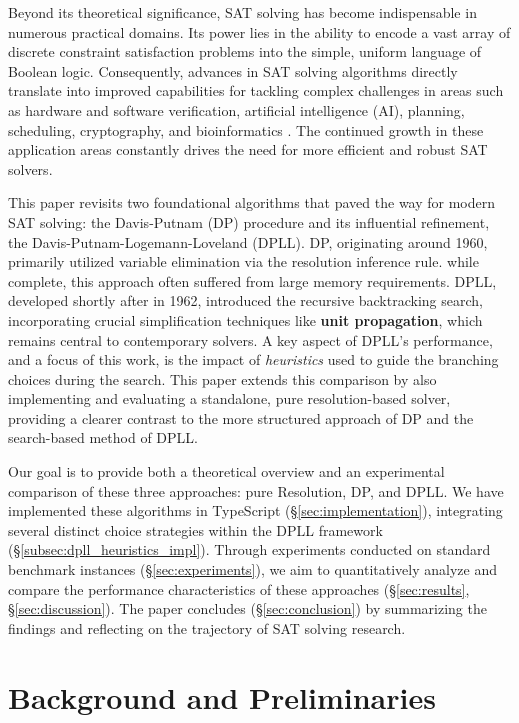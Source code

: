 \documentclass[12pt, a4paper]{article}
\begin{document}
Beyond its theoretical significance, SAT solving has become indispensable in numerous practical domains. Its power lies in the ability to encode a vast array of discrete constraint satisfaction problems into the simple, uniform language of Boolean logic. Consequently, advances in SAT solving algorithms directly translate into improved capabilities for tackling complex challenges in areas such as hardware and software verification, artificial intelligence (AI), planning, scheduling, cryptography, and bioinformatics \cite{Autoblocks}. The continued growth in these application areas constantly drives the need for more efficient and robust SAT solvers.

This paper revisits two foundational algorithms that paved the way for modern SAT solving: the Davis-Putnam (DP) procedure and its influential refinement, the Davis-Putnam-Logemann-Loveland (DPLL). DP, originating around 1960, primarily utilized variable elimination via the resolution inference rule. while complete, this approach often suffered from large memory requirements. DPLL, developed shortly after in 1962, introduced the recursive backtracking search, incorporating crucial simplification techniques like \textbf{unit propagation}, which remains central to contemporary solvers. A key aspect of DPLL's performance, and a focus of this work, is the impact of \emph{heuristics} used to guide the branching choices during the search. This paper extends this comparison by also implementing and evaluating a standalone, pure resolution-based solver, providing a clearer contrast to the more structured approach of DP and the search-based method of DPLL.

Our goal is to provide both a theoretical overview and an experimental comparison of these three approaches: pure Resolution, DP, and DPLL. We have implemented these algorithms in TypeScript (\S\ref{sec:implementation}), integrating several distinct choice strategies within the DPLL framework (\S\ref{subsec:dpll_heuristics_impl}). Through experiments conducted on standard benchmark instances (\S\ref{sec:experiments}), we aim to quantitatively analyze and compare the performance characteristics of these approaches (\S\ref{sec:results}, \S\ref{sec:discussion}). The paper concludes (\S\ref{sec:conclusion}) by summarizing the findings and reflecting on the trajectory of SAT solving research.


\section{Background and Preliminaries}
\label{sec:background}
\end{document}
